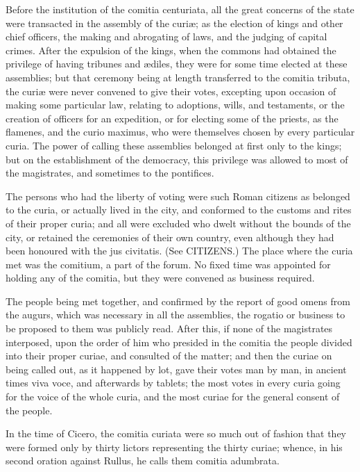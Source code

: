 \documentclass{article}
\begin{document}
Before the institution of the comitia centuriata, all the great concerns of the state were transacted in the assembly of the curiæ; as the election of kings and other chief officers, the making and abrogating of laws, and the judging of capital crimes. After the expulsion of the kings, when the commons had obtained the privilege of having tribunes and ædiles, they were for some time elected at these assemblies; but that ceremony being at length transferred to the comitia tributa, the curiæ were never convened to give their votes, excepting upon occasion of making some particular law, relating to adoptions, wills, and testaments, or the creation of officers for an expedition, or for electing some of the priests, as the flamenes, and the curio maximus, who were themselves chosen by every particular curia. The power of calling these assemblies belonged at first only to the kings; but on the establishment of the democracy, this privilege was allowed to most of the magistrates, and sometimes to the pontifices.

The persons who had the liberty of voting were such Roman citizens as belonged to the curia, or actually lived in the city, and conformed to the customs and rites of their proper curia; and all were excluded who dwelt without the bounds of the city, or retained the ceremonies of their own country, even although they had been honoured with the jus civitatis. (See CITIZENS.) The place where the curia met was the comitium, a part of the forum. No fixed time was appointed for holding any of the comitia, but they were convened as business required.

The people being met together, and confirmed by the report of good omens from the augurs, which was necessary in all the assemblies, the rogatio or business to be proposed to them was publicly read. After this, if none of the magistrates interposed, upon the order of him who presided in the comitia the people divided into their proper curiae, and consulted of the matter; and then the curiae on being called out, as it happened by lot, gave their votes man by man, in ancient times viva voce, and afterwards by tablets; the most votes in every curia going for the voice of the whole curia, and the most curiae for the general consent of the people.

In the time of Cicero, the comitia curiata were so much out of fashion that they were formed only by thirty lictors representing the thirty curiae; whence, in his second oration against Rullus, he calls them comitia adumbrata.
\end{document}
